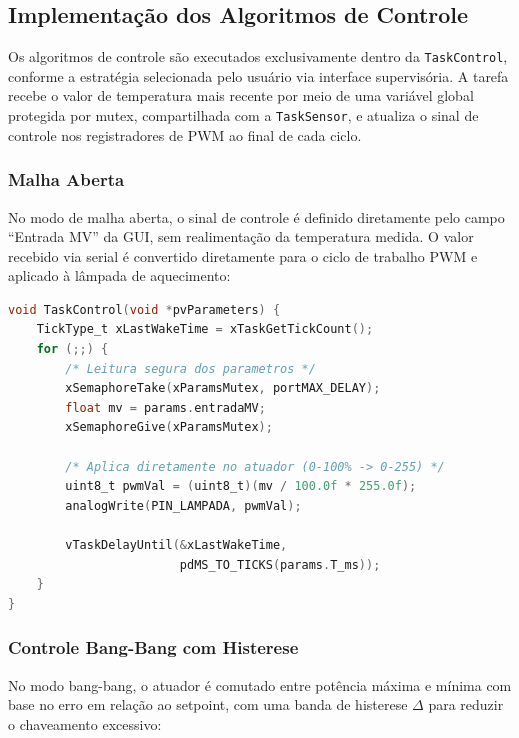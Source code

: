 \documentclass[repeatfields,xlists,xpacks,oneside]{ufrgscca}
\begin{document}
\subsection{Implementação dos Algoritmos de Controle}

Os algoritmos de controle são executados exclusivamente
dentro da \texttt{TaskControl}, conforme a estratégia
selecionada pelo usuário via interface supervisória.
A tarefa recebe o valor de temperatura mais recente por
meio de uma variável global protegida por mutex, compartilhada
com a \texttt{TaskSensor}, e atualiza o sinal de controle
nos registradores de PWM ao final de cada ciclo.

\subsubsection{Malha Aberta}

No modo de malha aberta, o sinal de controle é definido
diretamente pelo campo ``Entrada MV'' da GUI, sem realimentação
da temperatura medida. O valor recebido via serial é
convertido diretamente para o ciclo de trabalho PWM e
aplicado à lâmpada de aquecimento:

\begin{lstlisting}[language=C, caption={Pseudocódigo do modo malha aberta.},
                   label={lst:malha_aberta}]
void TaskControl(void *pvParameters) {
    TickType_t xLastWakeTime = xTaskGetTickCount();
    for (;;) {
        /* Leitura segura dos parametros */
        xSemaphoreTake(xParamsMutex, portMAX_DELAY);
        float mv = params.entradaMV;
        xSemaphoreGive(xParamsMutex);

        /* Aplica diretamente no atuador (0-100% -> 0-255) */
        uint8_t pwmVal = (uint8_t)(mv / 100.0f * 255.0f);
        analogWrite(PIN_LAMPADA, pwmVal);

        vTaskDelayUntil(&xLastWakeTime,
                        pdMS_TO_TICKS(params.T_ms));
    }
}
\end{lstlisting}

\subsubsection{Controle Bang-Bang com Histerese}

No modo bang-bang, o atuador é comutado entre potência
máxima e mínima com base no erro em relação ao setpoint,
com uma banda de histerese $\Delta$ para reduzir o
chaveamento excessivo:
\end{document}
